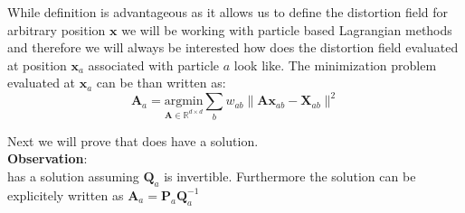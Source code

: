 \documentclass[oneside, a4paper, onecolumn, 11pt]{article}
\renewcommand{\AA}{\mathbf{A}}
\newcommand{\PP}{\mathbf{P}}
\newcommand{\xx}{\mathbf{x}}
\newcommand{\XX}{\mathbf{X}}
\newcommand{\QQ}{\mathbf{Q}}
\begin{document}
\begin{section}
\begin{subsection}
    While definition  is advantageous as it allows us to define the distortion field 
    for arbitrary position $\xx$ we will be working with particle based Lagrangian methods and therefore
    we will always be interested how does the distortion field evaluated at position $\xx_a$ associated with particle $a$
    look like. 
    The minimization problem  evaluated at $\xx_a$ can be than written as:
    \begin{equation} \label{ls_problem_a}
        \AA_{a} = \underset{\AA \in \mathbb{R}^{d\times d}}{\text{argmin}} \sum_{b} w_{ab} \|\AA \xx_{ab} - \XX_{ab}\|^2
    \end{equation}

    Next we will prove that  does have a solution.\\
    \textbf{Observation}:\\
     has a solution assuming $\QQ_a$ is invertible.
    Furthermore the solution can be explicitely written as $\AA_{a} = \PP_{a} \QQ_a^{-1}$


\end{subsection}
\end{section}
\end{document}
